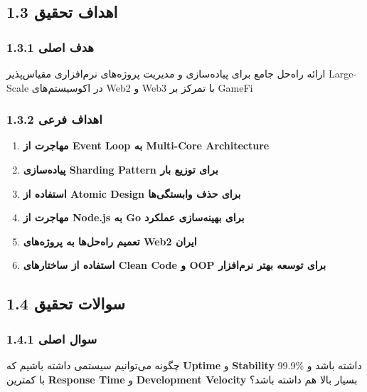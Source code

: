 \documentclass[
]{article}
\providecommand{\tightlist}{%
  \setlength{\itemsep}{0pt}\setlength{\parskip}{0pt}}
\begin{document}
\subsection{1.3 اهداف
تحقیق}\label{ux627ux647ux62fux627ux641-ux62aux62dux642ux6ccux642}

\subsubsection{1.3.1 هدف
اصلی}\label{ux647ux62fux641-ux627ux635ux644ux6cc}

ارائه راه‌حل جامع برای پیاده‌سازی و مدیریت پروژه‌های نرم‌افزاری مقیاس‌پذیر
Large-Scale در اکوسیستم‌های Web2 و Web3 با تمرکز بر GameFi

\subsubsection{1.3.2 اهداف
فرعی}\label{ux627ux647ux62fux627ux641-ux641ux631ux639ux6cc}

\begin{enumerate}
\def\labelenumi{\arabic{enumi}.}
\tightlist
\item
  \textbf{مهاجرت از Event Loop به Multi-Core Architecture}
\item
  \textbf{پیاده‌سازی Sharding Pattern برای توزیع بار}
\item
  \textbf{استفاده از Atomic Design برای حذف وابستگی‌ها}
\item
  \textbf{مهاجرت از Node.js به Go برای بهینه‌سازی عملکرد}
\item
  \textbf{تعمیم راه‌حل‌ها به پروژه‌های Web2 ایران}
\item
  \textbf{استفاده از ساختارهای Clean Code و OOP برای توسعه بهتر
  نرم‌افزار}
\end{enumerate}

\subsection{1.4 سوالات
تحقیق}\label{ux633ux648ux627ux644ux627ux62a-ux62aux62dux642ux6ccux642}

\subsubsection{1.4.1 سوال
اصلی}\label{ux633ux648ux627ux644-ux627ux635ux644ux6cc}

چگونه می‌توانیم سیستمی داشته باشیم که \textbf{Uptime} و
\textbf{Stability} 99.9\% داشته باشد و با کمترین \textbf{Response Time}
و \textbf{Development Velocity} بسیار بالا هم داشته باشد؟
\end{document}
